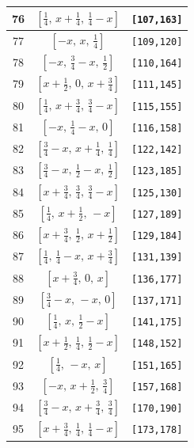 \documentclass[fleqn,8pt]{jsarticle}
\begin{document}
\begin{longtable}{ccc}
76 & $\left[ \frac{1}{4},\, x + \frac{1}{4},\, \frac{1}{4} - x \right]$ & {\tt [107,163]} \\ \hline
77 & $\left[ - x,\, x,\, \frac{1}{4} \right]$ & {\tt [109,120]} \\ \hline
78 & $\left[ - x,\, \frac{3}{4} - x,\, \frac{1}{2} \right]$ & {\tt [110,164]} \\ \hline
79 & $\left[ x + \frac{1}{2},\, 0,\, x + \frac{3}{4} \right]$ & {\tt [111,145]} \\ \hline
80 & $\left[ \frac{1}{4},\, x + \frac{3}{4},\, \frac{3}{4} - x \right]$ & {\tt [115,155]} \\ \hline
81 & $\left[ - x,\, \frac{1}{4} - x,\, 0 \right]$ & {\tt [116,158]} \\ \hline
82 & $\left[ \frac{3}{4} - x,\, x + \frac{1}{4},\, \frac{1}{4} \right]$ & {\tt [122,142]} \\ \hline
83 & $\left[ \frac{3}{4} - x,\, \frac{1}{2} - x,\, \frac{1}{2} \right]$ & {\tt [123,185]} \\ \hline
84 & $\left[ x + \frac{3}{4},\, \frac{3}{4},\, \frac{3}{4} - x \right]$ & {\tt [125,130]} \\ \hline
85 & $\left[ \frac{1}{4},\, x + \frac{1}{2},\, - x \right]$ & {\tt [127,189]} \\ \hline
86 & $\left[ x + \frac{3}{4},\, \frac{1}{2},\, x + \frac{1}{2} \right]$ & {\tt [129,184]} \\ \hline
87 & $\left[ \frac{1}{4},\, \frac{1}{4} - x,\, x + \frac{3}{4} \right]$ & {\tt [131,139]} \\ \hline
88 & $\left[ x + \frac{3}{4},\, 0,\, x \right]$ & {\tt [136,177]} \\ \hline
89 & $\left[ \frac{3}{4} - x,\, - x,\, 0 \right]$ & {\tt [137,171]} \\ \hline
90 & $\left[ \frac{1}{4},\, x,\, \frac{1}{2} - x \right]$ & {\tt [141,175]} \\ \hline
91 & $\left[ x + \frac{1}{2},\, \frac{1}{4},\, \frac{1}{2} - x \right]$ & {\tt [148,152]} \\ \hline
92 & $\left[ \frac{1}{4},\, - x,\, x \right]$ & {\tt [151,165]} \\ \hline
93 & $\left[ - x,\, x + \frac{1}{2},\, \frac{3}{4} \right]$ & {\tt [157,168]} \\ \hline
94 & $\left[ \frac{3}{4} - x,\, x + \frac{3}{4},\, \frac{3}{4} \right]$ & {\tt [170,190]} \\ \hline
95 & $\left[ x + \frac{3}{4},\, \frac{1}{4},\, \frac{1}{4} - x \right]$ & {\tt [173,178]} \\ \hline

\end{longtable}
\end{document}
